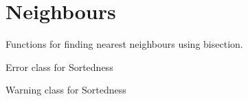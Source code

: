 \documentclass[letterpaper,10pt,english]{sphinxmanual}
\begin{document}
\section{Neighbours}
\label{\detokenize{users_guide:neighbours}}
\sphinxAtStartPar
Functions for finding nearest neighbours using bisection.

\begin{fulllineitems}
\label{\detokenize{users_guide:GeoSpatialTools.neighbours.SortedError}}
\pysigstartsignatures
{}
\pysigstopsignatures
\sphinxAtStartPar
Error class for Sortedness

\end{fulllineitems}


\begin{fulllineitems}
\label{\detokenize{users_guide:GeoSpatialTools.neighbours.SortedWarning}}
\pysigstartsignatures
{}
\pysigstopsignatures
\sphinxAtStartPar
Warning class for Sortedness

\end{fulllineitems}

\end{document}
